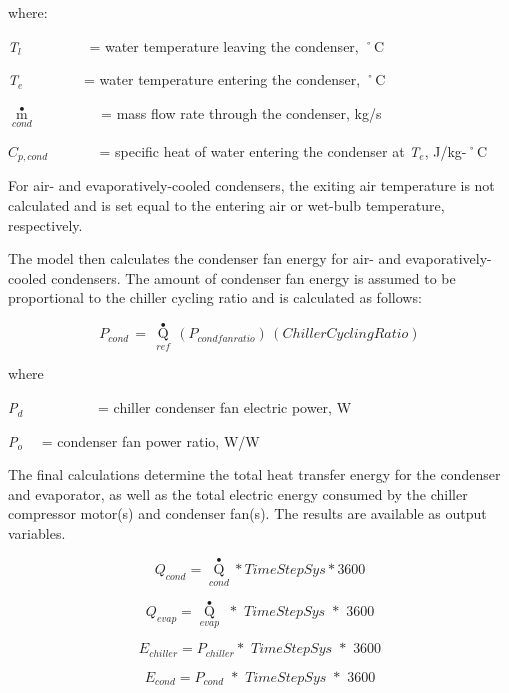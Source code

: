 where:

\emph{T\(_{l}\)}~~~~~~~~~ = water temperature leaving the condenser, ˚C

\emph{T\(_{e}\)}~~~~~~~~ = water temperature entering the condenser, ˚C

\({\mathop m\limits^ \bullet_{cond}}\) ~~~~~~~~ = mass flow rate through the condenser, kg/s

\({C_{p,cond}}\) ~~~~~~ = specific heat of water entering the condenser at \emph{T\(_{e}\)}, J/kg-˚C

For air- and evaporatively-cooled condensers, the exiting air temperature is not calculated and is set equal to the entering air or wet-bulb temperature, respectively.

The model then calculates the condenser fan energy for air- and evaporatively-cooled condensers. The amount of condenser fan energy is assumed to be proportional to the chiller cycling ratio and is calculated as follows:

\begin{equation}
{P_{cond}}\, = \,{\mathop Q\limits^ \bullet_{ref}}\,\left( {{P_{condfanratio}}} \right)\,\left( {ChillerCyclingRatio} \right)
\end{equation}

where

\emph{P\(_{d}\)}~~~~~~~~~~ = chiller condenser fan electric power, W

\emph{P\(_{o}\)}~~ = condenser fan power ratio, W/W

The final calculations determine the total heat transfer energy for the condenser and evaporator, as well as the total electric energy consumed by the chiller compressor motor(s) and condenser fan(s). The results are available as output variables.

\begin{equation}
{Q_{cond}} = {\mathop Q\limits^ \bullet_{cond}}*TimeStepSys*3600
\end{equation}

\begin{equation}
{Q_{evap}} = {\mathop Q\limits^ \bullet_{evap}}\,\,*\,\,TimeStepSys\,\,*\,\,3600
\end{equation}

\begin{equation}
{E_{chiller}} = {P_{chiller}}*\,\,TimeStepSys\,\,*\,\,3600
\end{equation}

\begin{equation}
{E_{cond}} = {P_{cond}}\,\, * \,\,TimeStepSys\,\,*\,\,3600
\end{equation}

